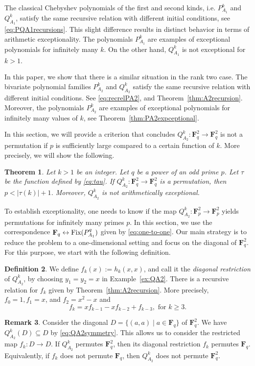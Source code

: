 \documentclass{amsart}
\newcommand{\F}{\mathbf F}
\newcommand{\Fix}{\textnormal{Fix}}
\numberwithin{equation}{section}
\theoremstyle{plain}
\newtheorem{theorem}{Theorem}
\theoremstyle{definition}
\newtheorem{definition}[theorem]{Definition}
\newtheorem{remark}[theorem]{Remark}
\begin{document}
The classical Chebyshev polynomials of the first and second kinds, i.e. $P_{A_1}^k$ and $Q_{A_1}^k$, satisfy the same recursive relation with different initial conditions, see \eqref{eq:PQA1recursions}. This slight difference results in distinct behavior in terms of arithmetic exceptionality. The polynomials $P_{A_1}^k$ are examples of exceptional polynomials for infinitely many $k$. On the other hand, $Q_{A_1}^k$ is not exceptional for $k>1$.

In this paper, we show that there is a similar situation in the rank two case. The bivariate polynomial families $P_{A_2}^k$ and $Q_{A_2}^k$ satisfy the same recursive relation with different initial conditions. See \eqref{eq:recrelPA2}, and Theorem~\ref{thm:A2recursion}. Moreover, the polynomials $P_{A_2}^k$ are examples of exceptional polynomials for infinitely many values of $k$, see Theorem~\ref{thm:PA2expceptional}.


In this section, we will provide a criterion that concludes $Q_{A_2}^k: \F_q^2 \rightarrow \F_q^2$ is not a permutation if $p$ is sufficiently large compared to a certain function of $k$. More precisely, we will show the following.
\begin{theorem}\label{thm:A2main}
Let $k>1$ be an integer. Let $q$ be a power of an odd prime $p$. Let $\tau$ be the function defined by \eqref{eq:tau}. If $Q_{A_2}^k:\F_q^2 \rightarrow \F_q^2$ is a permutation, then $p<|\tau(k)|+1$. Moreover, $Q_{A_2}^k$ is not arithmetically exceptional.
\end{theorem}

To establish exceptionality, one needs to know if the map $Q_{A_2}^k:\F_p^2\rightarrow\F_p^2$ yields permutations for infinitely many primes $p$. In this section, we use the correspondence $\F_q \leftrightarrow  \Fix(P_{A_1}^q)$ given by \eqref{eq:one-to-one}. Our main strategy is to reduce the problem to a one-dimensional setting and focus on the diagonal of $\F_q^2$. For this purpose, we start with the following definition.
\begin{definition}\label{def:diag}
We define $f_k(x):=h_k(x,x)$, and call it the \textit{diagonal restriction} of $Q^k_{A_2}$, by choosing $y_1=y_2=x$ in Example~\ref{ex:QA2}. There is a recursive relation for $f_k$ given by Theorem~\ref{thm:A2recursion}. More precisely, $f_0=1,f_1=x$, and $f_2=x^2-x$ and
$$f_k=xf_{k-1}-xf_{k-2}+f_{k-3}, \text{ for }k\ge3.$$
\end{definition}

\begin{remark}\label{rem:diag}
Consider the diagonal $D=\{(a,a)\mathrel{|} a\in\F_q\}$ of $\F_q^2$. We have $Q^k_{A_2}(D) \subseteq D$ by \eqref{eq:QA2symmetry}. This allows us to consider the restricted map $f_k: D \rightarrow D$. If $Q^k_{A_2}$ permutes $\F_q^2$, then its diagonal restriction $f_k$ permutes $\F_q$. Equivalently, if $f_k$ does not permute $\F_q$, then $Q^k_{A_2}$ does not permute $\F_q^2$.
\end{remark}
\end{document}
